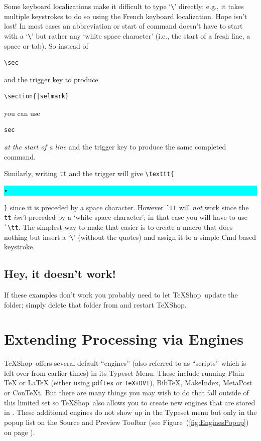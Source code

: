 \documentclass[letterpaper,11pt]{article}
\newcommand{\TS}{\textsf{\TeX Shop}}
\newcommand{\mnu}[1]{\textsf{#1}}
\newcommand{\selmark}{\colorbox{cyan}{\rule[-0.5ex]{0ex}{2.1ex}\texttt{•}}}
\begin{document}
Some keyboard localizations make it difficult to type `\verb|\|' directly; e.g., it takes multiple keystrokes to do so using the French keyboard localization. Hope isn't lost! In most cases an abbreviation or start of command doesn't have to start with a `\verb|\|' but rather any `white space character' (i.e., the start of a fresh line, a space or tab). So instead of 
\begin{verbatim}
\sec
\end{verbatim}
and the trigger key to produce
\begin{verbatim}
\section{|selmark}
\end{verbatim}
you can use
\begin{verbatim}
sec
\end{verbatim}
\emph{at the start of a line} and the trigger key to produce the same completed command.

Similarly, writing \verb|tt| and the trigger will give \verb|\texttt{|\selmark\verb|}| since it is preceded by a space character. However \verb|`tt| will \emph{not} work since the \verb|tt| \emph{isn't} preceded by a `white space character'; in that case you will have to use \verb|`\tt|. The simplest way to make that easier is to create a macro that does nothing but insert a `\verb|\|' (without the quotes) and assign it to a simple \mnu{Cmd} based keystroke.

\subsection{Hey, it doesn't work!}

If these examples don't work you probably need to let \TS\ update the  folder; simply delete that folder from  and restart \TS.

\section{Extending Processing via Engines}

\TS\ offers several default ``engines'' (also referred to as ``scripts'' which is left over from earlier times) in its \mnu{Typeset} Menu. These include running \mnu{Plain TeX} or \mnu{LaTeX} (either using \texttt{pdftex} or \texttt{TeX+DVI}), \mnu{BibTeX}, \mnu{MakeIndex}, \mnu{MetaPost} or \mnu{ConTeXt}. But there are many things you may wish to do that fall outside of this limited set so \TS\ also allows you to create new engines that are stored in . These additional engines do not show up in the \mnu{Typeset} menu but only in the popup list on the Source and Preview Toolbar (see Figure~(\ref{fig:EnginesPopup}) on page \pageref{fig:EnginesPopup}). 
\end{document}
